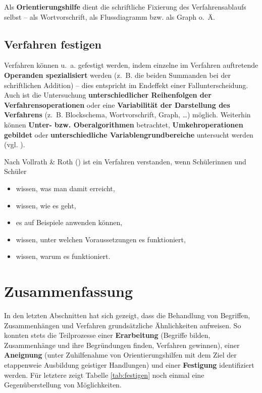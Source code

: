 \documentclass[
]{scrbook}
\providecommand{\tightlist}{%
  \setlength{\itemsep}{0pt}\setlength{\parskip}{0pt}}
\theoremstyle{definition}
\theoremstyle{definition}
\theoremstyle{definition}
\theoremstyle{definition}
\theoremstyle{remark}
\begin{document}
Als \textbf{Orientierungshilfe} dient die schriftliche Fixierung des Verfahrensablaufs selbst -- als Wortvorschrift, als Flussdiagramm bzw. als Graph o.~Ä.

\subsection{Verfahren festigen}\label{verfahren-festigen}

Verfahren können u.~a. gefestigt werden, indem einzelne im Verfahren auftretende \textbf{Operanden spezialisiert} werden (z.~B. die beiden Summanden bei der schriftlichen Addition) -- dies entspricht im Endeffekt einer Fallunterscheidung. Auch ist die Untersuchung \textbf{unterschiedlicher Reihenfolgen der Verfahrensoperationen} oder eine \textbf{Variabilität der Darstellung des Verfahrens} (z.~B. Blockschema, Wortvorschrift, Graph, \ldots) möglich. Weiterhin können \textbf{Unter- bzw. Oberalgorithmen} betrachtet, \textbf{Umkehroperationen gebildet} oder \textbf{unterschiedliche Variablengrundbereiche} untersucht werden (vgl. ).

Nach Vollrath \& Roth () ist ein Verfahren verstanden, wenn Schülerinnen und Schüler

\begin{itemize}
\tightlist
\item
  wissen, was man damit erreicht,\\
\item
  wissen, wie es geht,\\
\item
  es auf Beispiele anwenden können,\\
\item
  wissen, unter welchen Voraussetzungen es funktioniert,\\
\item
  wissen, warum es funktioniert.
\end{itemize}

\section{Zusammenfassung}\label{zusammenfassung}

In den letzten Abschnitten hat sich gezeigt, dass die Behandlung von Begriffen, Zusammenhängen und Verfahren grundsätzliche Ähnlichkeiten aufweisen. So konnten stets die Teilprozesse einer \textbf{Erarbeitung} (Begriffe bilden, Zusammenhänge und ihre Begründungen finden, Verfahren gewinnen), einer \textbf{Aneignung} (unter Zuhilfenahme von Orientierungshilfen mit dem Ziel der etappenweie Ausbildung geistiger Handlungen) und einer \textbf{Festigung} identifiziert werden. Für letztere zeigt Tabelle \ref{tab:festigen} noch einmal eine Gegenüberstellung von Möglichkeiten.
\end{document}
